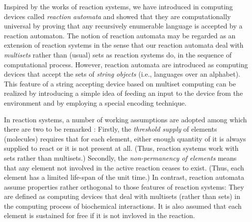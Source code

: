 \documentclass[preprint,fleqn,1p]{elsarticle}
\begin{document}
Inspired by the works of reaction systems,  we have introduced in \cite{OKY:12} computing devices called {\it reaction automata} and  showed  that they are computationally universal by proving that any recursively enumerable language is accepted by a reaction automaton.  
The notion of reaction automata may be regarded as an extension of reaction systems in the sense that our reaction automata deal with {\it multisets} rather than (usual) sets  as reaction systems do, in the sequence of computational process.  
However,  reaction automata are introduced as computing devices that accept the sets of {\it string objects} (i.e., languages over an alphabet).  This feature of a string accepting device based on multiset 
computing can be realized by introducing a simple idea of feeding an input to the device from the environment and by employing a special encoding technique.  


In reaction systems, a number of working assumptions are adopted among which  there are two to be remarked : Firstly, the {\it threshold supply} of elements (molecules) requires that for each element, either enough quantity of it is always supplied to react or it is not present at all. (Thus, reaction systems work with sets rather than multisets.) Secondly, the {\it non-permanency of elements} means that any element not involved in the active reaction ceases  to exist. (Thus, each element has a limited life-span of the unit time.)  
In contrast,  reaction automata assume  properties rather orthogonal to those features of reaction systems: They are defined as computing devices that deal with multisets (rather than sets) in the computing  process of biochemical interactions. It is also assumed that each element is sustained for free if it is not invloved in the reaction.
\end{document}
